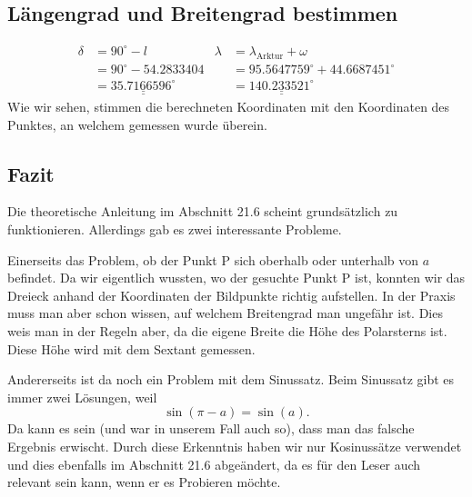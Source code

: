 \subsection{Längengrad und Breitengrad bestimmen}

\begin{align*}
\delta &= 90^\circ - l &
	\lambda &= \lambda_{\text{Arktur}} + \omega \\
&= 90^\circ - 54.2833404 &
	&= 95.5647759^\circ + 44.6687451^\circ \\
&= \underline{\underline{35.7166596^\circ}} &
	&= \underline{\underline{140.233521^\circ}} 
\end{align*}
Wie wir sehen, stimmen die berechneten Koordinaten mit den Koordinaten des Punktes, an welchem gemessen wurde überein. 

\subsection{Fazit}
Die theoretische Anleitung im Abschnitt 21.6 scheint grundsätzlich zu funktionieren. 
Allerdings gab es zwei interessante Probleme.

Einerseits das Problem, ob der Punkt P sich oberhalb oder unterhalb von $a$ befindet. 
Da wir eigentlich wussten, wo der gesuchte Punkt P ist, konnten wir das Dreieck anhand der Koordinaten der Bildpunkte richtig aufstellen. 
In der Praxis muss man aber schon wissen, auf welchem Breitengrad man ungefähr ist. 
Dies weis man in der Regeln aber, da die eigene Breite die Höhe des Polarsterns ist.
Diese Höhe wird mit dem Sextant gemessen.

Andererseits ist da noch ein Problem mit dem Sinussatz.
Beim Sinussatz gibt es immer zwei Lösungen, weil \[ \sin(\pi-a)=\sin(a).\]
Da kann es sein (und war in unserem Fall auch so), dass man das falsche Ergebnis erwischt. 
Durch diese Erkenntnis haben wir nur Kosinussätze verwendet und dies ebenfalls im Abschnitt 21.6 abgeändert, da es für den Leser auch relevant sein kann, wenn er es Probieren möchte.




